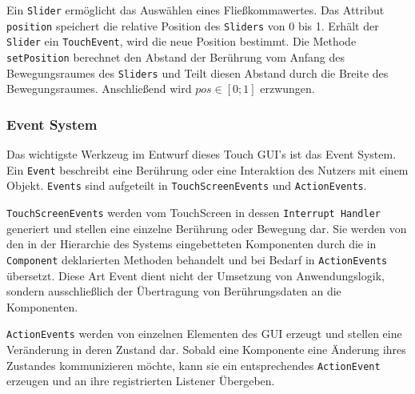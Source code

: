 		\medskip
		\begin{figure}
			\label{uml-slider}
		\end{figure}
		Ein \texttt{Slider} ermöglicht das Auswählen eines Fließkommawertes.
		Das Attribut \texttt{position} speichert die relative Position des \texttt{Sliders} von 0 bis 1.
		Erhält der \texttt{Slider} ein \texttt{TouchEvent}, wird die neue Position bestimmt.
		Die Methode \texttt{setPosition} berechnet den Abstand der Berührung vom Anfang des Bewegungsraumes des \texttt{Sliders}
		und Teilt diesen Abstand durch die Breite des Bewegungsraumes. Anschließend wird $pos \in [0; 1]$ erzwungen.
		
	\subsubsection{Event System}\label{sec:EventSystem}
		Das wichtigste Werkzeug im Entwurf dieses Touch GUI's ist das Event System.
		Ein \texttt{Event} beschreibt eine Berührung oder eine Interaktion des Nutzers mit einem Objekt.
		\texttt{Events} sind aufgeteilt in \texttt{TouchScreenEvents} und \texttt{ActionEvents}.

		\texttt{TouchScreenEvents} werden vom TouchScreen in dessen \texttt{Interrupt Handler} generiert und stellen eine einzelne Berührung oder Bewegung dar.
		Sie werden von den in der Hierarchie des Systems eingebetteten Komponenten durch die in \texttt{Component} deklarierten Methoden behandelt
		und bei Bedarf in \texttt{ActionEvents} übersetzt.
		Diese Art Event dient nicht der Umsetzung von Anwendungslogik, sondern ausschließlich der Übertragung von Berührungsdaten an die Komponenten.
		
		\texttt{ActionEvents} werden von einzelnen Elementen des GUI erzeugt und stellen eine Veränderung in deren Zustand dar.
		Sobald eine Komponente eine Änderung ihres Zustandes kommunizieren möchte, kann sie ein entsprechendes \texttt{ActionEvent} erzeugen
		und an ihre registrierten Listener Übergeben.
		
		